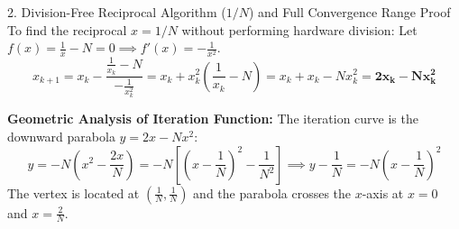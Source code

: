 \documentclass[11pt,a4paper]{article}
\begin{document}
\begin{formulabox}{\texorpdfstring{2. Division-Free Reciprocal Algorithm ($1/N$) and Full Convergence Range Proof}{2. Division-Free Reciprocal Algorithm (1/N) and Full Convergence Range Proof}}
To find the reciprocal $x = 1/N$ without performing hardware division:
Let $f(x) = \frac{1}{x} - N = 0 \implies f'(x) = -\frac{1}{x^2}$.
\begin{equation}
    x_{k+1} = x_k - \frac{\frac{1}{x_k} - N}{-\frac{1}{x_k^2}} = x_k + x_k^2 \left(\frac{1}{x_k} - N\right) = x_k + x_k - N x_k^2 = \mathbf{2x_k - N x_k^2}
\end{equation}

\begin{center}
\end{center}

\textbf{Geometric Analysis of Iteration Function:}
The iteration curve is the downward parabola $y = 2x - N x^2$:
$$y = -N\left(x^2 - \frac{2x}{N}\right) = -N\left[\left(x - \frac{1}{N}\right)^2 - \frac{1}{N^2}\right] \implies y - \frac{1}{N} = -N\left(x - \frac{1}{N}\right)^2$$
The vertex is located at $\left(\frac{1}{N}, \frac{1}{N}\right)$ and the parabola crosses the $x$-axis at $x = 0$ and $x = \frac{2}{N}$.


\end{formulabox}
\end{document}
